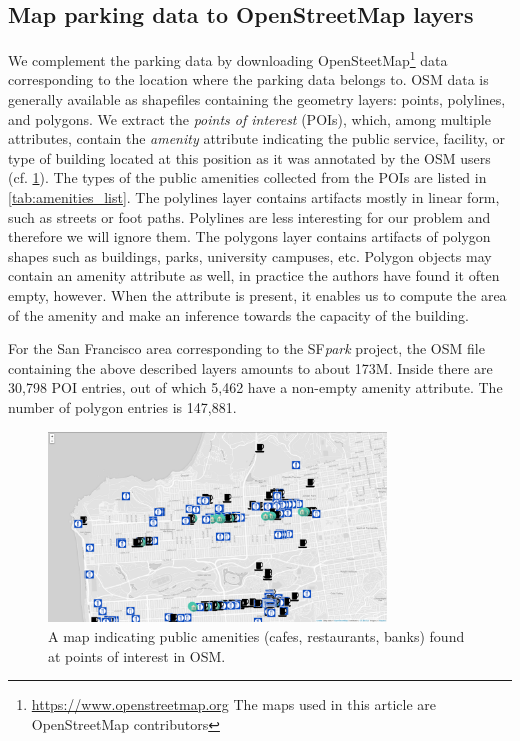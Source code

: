 	\subsection{Map parking data to OpenStreetMap layers}
	We complement the parking data by downloading OpenSteetMap\footnote{\url{https://www.openstreetmap.org} The maps used in this article are \textcopyright OpenStreetMap contributors} data corresponding to the location where the parking data belongs to. OSM data is generally available as shapefiles containing the geometry layers: points, polylines, and polygons. We extract the \textit{points of interest} (POIs), which, among multiple attributes, contain the \textit{amenity} attribute indicating the public service, facility, or type of building located at this position as it was annotated by the OSM users (cf. \cref{fig:pois}). The types of the public amenities collected from the POIs are listed in \cref{tab:amenities_list}. The polylines layer contains artifacts mostly in linear form, such as streets or foot paths. Polylines are less interesting for our problem and therefore we will ignore them. The polygons layer contains artifacts of polygon shapes such as buildings, parks, university campuses, etc. Polygon objects may contain an amenity attribute as well, in practice the authors have found it often empty, however. When the attribute is present, it enables us to compute the area of the amenity and make an inference towards the capacity of the building.
	
	For the San Francisco area corresponding to the SF\textit{park} project, the OSM file containing the above described layers amounts to about 173M. Inside there are 30,798 POI entries, out of which 5,462 have a non-empty amenity attribute. The number of polygon entries is 147,881.  
	
	\begin{figure}[!ht]
		\centering
		\includegraphics[width=0.8\textwidth]{graphics/cafes_restaurants_banks_larger.png}
		\caption{A map indicating public amenities (cafes, restaurants, banks) found at points of interest in OSM.}
		\label{fig:pois}
	\end{figure}
	
